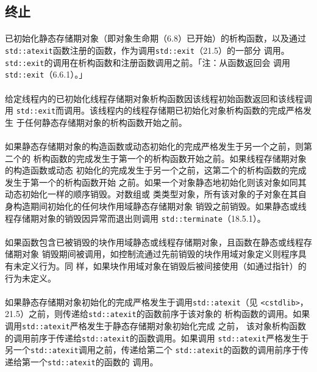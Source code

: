 \subsection{终止}
\paragraph{}
已初始化静态存储期对象（即对象生命期（6.8）已开始）的析构函数，以及通过
\texttt{std::atexit}函数注册的函数，作为调用\texttt{std::exit}（21.5）的一部分
调用。\texttt{std::exit}的调用在析构函数和注册函数调用之前。「注：从函数返回会
调用\texttt{std::exit}（6.6.1）。」

\paragraph{}
给定线程内的已初始化线程存储期对象析构函数因该线程初始函数返回和该线程调用
\texttt{std::exit}而调用。该线程内的线程存储期已初始化对象析构函数的完成严格发生
于任何静态存储期对象的析构函数开始之前。

\paragraph{}
如果静态存储期对象的构造函数或动态初始化的完成严格发生于另一个之前，则第二个的
析构函数的完成发生于第一个的析构函数开始之前。如果线程存储期对象的构造函数或动态
初始化的完成发生于另一个之前，这第二个的析构函数的完成发生于第一个的析构函数开始
之前。如果一个对象静态地初始化则该对象如同其动态初始化一样的顺序销毁。对数组或
类类型对象，所有该对象的子对象在其自身构造期间初始化的任何块作用域静态存储期对象
销毁之前销毁。如果静态或线程存储期对象的销毁因异常而退出则调用
\texttt{std::terminate}（18.5.1）。

\paragraph{}
如果函数包含已被销毁的块作用域静态或线程存储期对象，且函数在静态或线程存储期对象
销毁期间被调用，如控制流通过先前销毁的块作用域对象定义则程序具有未定义行为。同
样，如果块作用域对象在销毁后被间接使用（如通过指针）的行为未定义。

\paragraph{}
如果静态存储期对象初始化的完成严格发生于调用\texttt{std::atexit}（见
\texttt{<cstdlib>}，21.5）之前，则传递给\texttt{std::atexit}的函数前序于该对象的
析构函数的调用。如果调用\texttt{std::atexit}严格发生于静态存储期对象初始化完成
之前，
该对象析构函数的调用前序于传递给\texttt{std::atexit}的函数调用。如果调用
\texttt{std::atexit}严格发生于另一个\texttt{std::atexit}调用之前，传递给第二个
\texttt{std::atexit}的函数的调用前序于传递给第一个\texttt{std::atexit}的函数的
调用。


